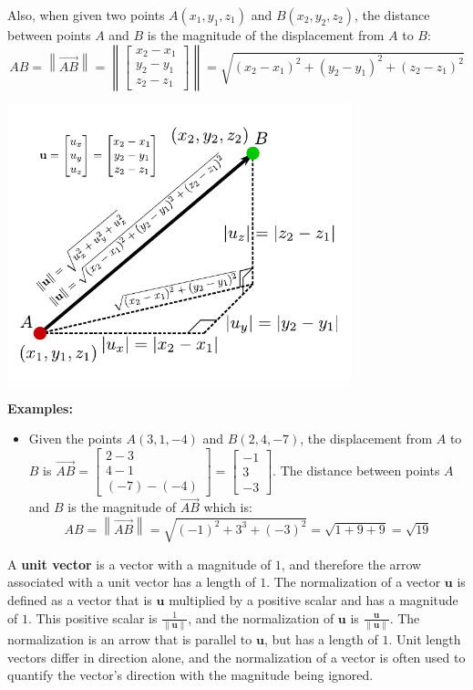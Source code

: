 \documentclass{article}
\begin{document}
Also, when given two points \(A(x_1, y_1, z_1)\) and \(B(x_2, y_2, z_2)\), the distance between points \(A\) and \(B\) is the magnitude of the displacement from \(A\) to \(B\): 
\[AB = \left\|\overrightarrow{AB}\right\| = \left\|\begin{bmatrix} x_2 - x_1 \\ y_2 - y_1 \\ z_2 - z_1 \end{bmatrix}\right\| = \sqrt{(x_2 - x_1)^2 + (y_2 - y_1)^2 + (z_2 - z_1)^2}\]

\begin{center}
\includegraphics[width = 0.75\textwidth]{displacement_vector_magnitude}
\end{center}

\textbf{Examples:}
\begin{itemize}
\item Given the points \(A(3, 1, -4)\) and \(B(2, 4, -7)\), the displacement from \(A\) to \(B\) is \(\overrightarrow{AB} = \begin{bmatrix} 2 - 3 \\ 4 - 1 \\ (-7) - (-4) \end{bmatrix} = \begin{bmatrix} -1 \\ 3 \\ -3 \end{bmatrix}\). The distance between points \(A\) and \(B\) is the magnitude of \(\overrightarrow{AB}\) which is:
\[AB = \left\|\overrightarrow{AB}\right\| = \sqrt{(-1)^2 + 3^3 + (-3)^2} = \sqrt{1 + 9 + 9} = \sqrt{19}\]
\end{itemize}

A {\bf unit vector} is a vector with a magnitude of \(1\), and therefore the arrow associated with a unit vector has a length of \(1\). The normalization of a vector \(\mathbf{u}\) is defined as a vector that is \(\mathbf{u}\) multiplied by a positive scalar and has a magnitude of \(1\). This positive scalar is \(\frac{1}{\|\mathbf{u}\|}\), and the normalization of \(\mathbf{u}\) is \(\frac{\mathbf{u}}{\|\mathbf{u}\|}\). The normalization is an arrow that is parallel to \(\mathbf{u}\), but has a length of \(1\). Unit length vectors differ in direction alone, and the normalization of a vector is often used to quantify the vector's direction with the magnitude being ignored.  
\end{document}
